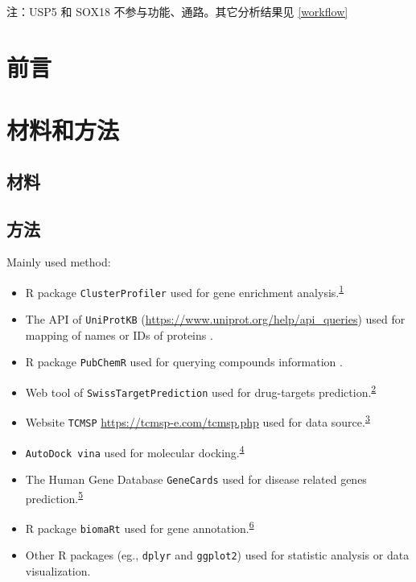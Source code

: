 \documentclass[
]{article}
\providecommand{\tightlist}{%
  \setlength{\itemsep}{0pt}\setlength{\parskip}{0pt}}
\begin{document}
注：USP5 和 SOX18 不参与功能、通路。其它分析结果见 \ref{workflow}

\hypertarget{introduction}{%
\section{前言}\label{introduction}}

\hypertarget{methods}{%
\section{材料和方法}\label{methods}}

\hypertarget{ux6750ux6599}{%
\subsection{材料}\label{ux6750ux6599}}

\hypertarget{ux65b9ux6cd5}{%
\subsection{方法}\label{ux65b9ux6cd5}}

Mainly used method:

\begin{itemize}
\tightlist
\item
  R package \texttt{ClusterProfiler} used for gene enrichment analysis.\textsuperscript{\protect\hyperlink{ref-ClusterprofilerWuTi2021}{1}}
\item
  The API of \texttt{UniProtKB} (\url{https://www.uniprot.org/help/api_queries}) used for mapping of names or IDs of proteins .
\item
  R package \texttt{PubChemR} used for querying compounds information .
\item
  Web tool of \texttt{SwissTargetPrediction} used for drug-targets prediction.\textsuperscript{\protect\hyperlink{ref-SwisstargetpredDaina2019}{2}}
\item
  Website \texttt{TCMSP} \url{https://tcmsp-e.com/tcmsp.php} used for data source.\textsuperscript{\protect\hyperlink{ref-TcmspADatabaRuJi2014}{3}}
\item
  \texttt{AutoDock\ vina} used for molecular docking.\textsuperscript{\protect\hyperlink{ref-AutodockVina1Eberha2021}{4}}
\item
  The Human Gene Database \texttt{GeneCards} used for disease related genes prediction.\textsuperscript{\protect\hyperlink{ref-TheGenecardsSStelze2016}{5}}
\item
  R package \texttt{biomaRt} used for gene annotation.\textsuperscript{\protect\hyperlink{ref-MappingIdentifDurinc2009}{6}}
\item
  Other R packages (eg., \texttt{dplyr} and \texttt{ggplot2}) used for statistic analysis or data visualization.
\end{itemize}
\end{document}
